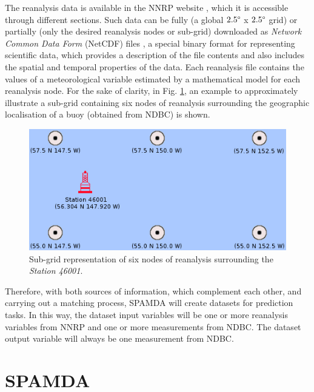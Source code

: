 \documentclass[energies,article,submit,moreauthors,pdftex]{Definitions/mdpi}
\begin{document}
\begin{itemize}
			The reanalysis data is available in the NNRP website \cite{NNRP}, which it is accessible through different sections. Such data can be fully (a global $2.5\degree$ x $2.5\degree$ grid) or partially (only the desired reanalysis nodes or sub-grid) downloaded as \textit{Network Common Data Form} (NetCDF) files \cite{NetCDF}, a special binary format for representing scientific data, which provides a description of the file contents and also includes the spatial and temporal properties of the data. Each reanalysis file contains the values of a meteorological variable estimated by a mathematical model for each reanalysis node. For the sake of clarity, in Fig. \ref{fig:subGrid}, an example to approximately illustrate a sub-grid containing six nodes of reanalysis surrounding the geographic localisation of a buoy (obtained from NDBC) is shown.
			
			\begin{figure}[ht!]
				\centering
				\includegraphics[scale=0.55]{figures/FigureSubGrid.jpg}
				\caption{Sub-grid representation of six nodes of reanalysis surrounding the \textit{Station 46001}.}
				\label{fig:subGrid}
			\end{figure}
			
		\end{itemize}
		
		Therefore, with both sources of information, which complement each other, and carrying out a matching process, SPAMDA will create datasets for prediction tasks. In this way, the dataset input variables will be one or more reanalysis variables from NNRP and one or more measurements from NDBC. The dataset output variable will always be one measurement from NDBC.
		
	\section{SPAMDA}\label{sec:SPAMDA}
		
\end{document}
